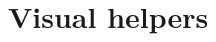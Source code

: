 \documentclass[Orbiter User Manual.tex]{subfiles}
\begin{document}
\section{Visual helpers}

\end{document}
